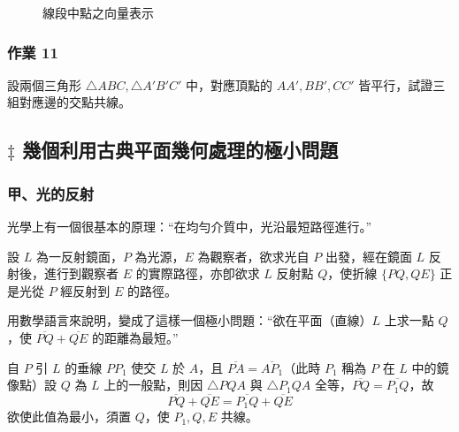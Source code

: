 \begin{figure}[H]
\centering
{}
\caption{線段中點之向量表示}
\label{fig:5-22}
\end{figure}

\subsubsection*{作業 11}
設兩個三角形 $\triangle ABC, \triangle A'B'C'$ 中，對應頂點的 $AA', BB', CC'$ 皆平行，試證三組對應邊的交點共線。

\subsection{\texorpdfstring{$\ddagger$ }{‡ }幾個利用古典平面幾何處理的極小問題}\label{sec:b3s-5-4}

\subsubsection*{甲、光的反射}

光學上有一個很基本的原理：“在均勻介質中，光沿最短路徑進行。”

設 $L$ 為一反射鏡面，$P$ 為光源，$E$ 為觀察者，欲求光自 $P$ 出發，經在鏡面 $L$ 反射後，進行到觀察者 $E$ 的實際路徑，亦卽欲求 $L$ 反射點 $Q$，使折線 $\{PQ, QE\}$ 正是光從 $P$ 經反射到 $E$ 的路徑。

用數學語言來說明，變成了這樣一個極小問題：“欲在平面（直線）$L$ 上求一點 $Q$，使 $\overline{PQ} + \overline{QE}$ 的距離為最短。”

自 $P$ 引 $L$ 的垂線 $PP_1$ 使交 $L$ 於 $A$，且 $\overline{PA} = \overline{AP_1}$（此時 $P_1$ 稱為 $P$ 在 $L$ 中的鏡像點）設 $Q$ 為 $L$ 上的一般點，則因 $\triangle PQA$ 與 $\triangle P_1QA$ 全等，$\overline{PQ} = \overline{P_1Q}$，故
\[ \overline{PQ} + \overline{QE} = \overline{P_1Q} + \overline{QE} \]
欲使此值為最小，須置 $Q$，使 $P_1, Q, E$ 共線。

